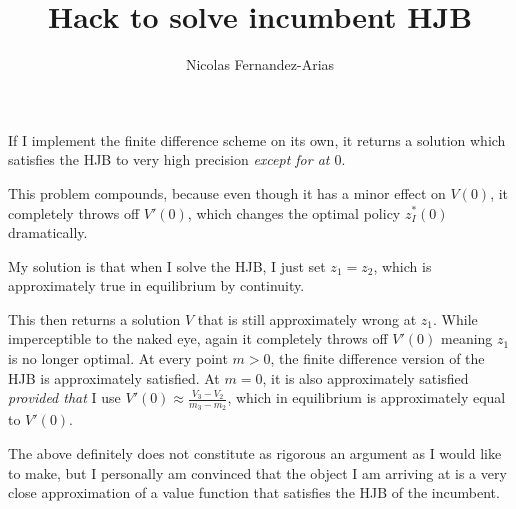 \documentclass[11pt,english]{article}
\theoremstyle{remark}
\begin{document}
	
\title{Hack to solve incumbent HJB}
\author{Nicolas Fernandez-Arias}
\maketitle

If I implement the finite difference scheme on its own, it returns a solution which satisfies the HJB to very high precision \textit{except for at $0$}. 

This problem compounds, because even though it has a minor effect on $V(0)$, it completely throws off $V'(0)$, which changes the optimal policy $z_I^*(0)$ dramatically. 

My solution is that when I solve the HJB, I just set $z_1 = z_2$, which is approximately true in equilibrium by continuity. 

This then returns a solution $V$ that is still approximately wrong at $z_1$. While imperceptible to the naked eye, again it completely throws off $V'(0)$ meaning $z_1$ is no longer optimal. At every point $m > 0$, the finite difference version of the HJB is approximately satisfied. At $m = 0$, it is also approximately satisfied \textit{provided that} I use $V'(0) \approx \frac{V_3-V_2}{m_3 - m_2}$, which in equilibrium is approximately equal to $V'(0)$. 

The above definitely does not constitute as rigorous an argument as I would like to make, but I personally am convinced that the object I am arriving at is a very close approximation of a value function that satisfies the HJB of the incumbent. 
\end{document}
